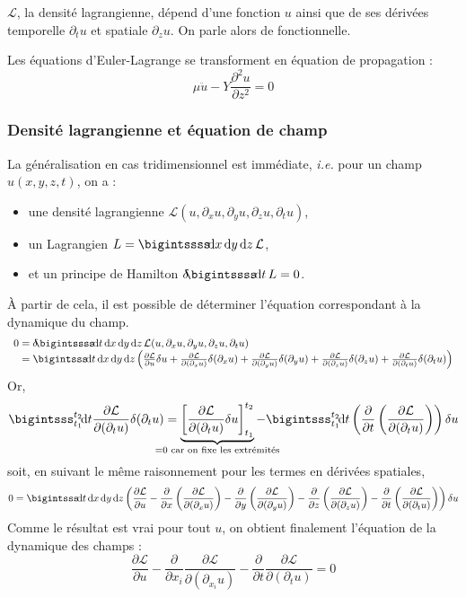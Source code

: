 $\mathcal{L}$, la densité lagrangienne, dépend d'une fonction $u$ ainsi que de ses dérivées temporelle $\partial_t u$ et spatiale $\partial_z u$. On parle alors de fonctionnelle.

Les équations d'Euler-Lagrange se transforment en équation de propagation :
$$
	\mu \ddot{u}-Y\frac{\partial^2u}{\partial z^2}=0
$$

\subsubsection{Densité lagrangienne et équation de champ}
La généralisation en cas tridimensionnel est immédiate, \emph{i.e.} pour un champ $u(x,y,z,t)$, on a :
\begin{itemize}
	\item une densité lagrangienne $\mathcal{L}(u,\partial_x u,\partial_y u,\partial_z u,\partial_t u)$,
	\item un Lagrangien $L=\bigintssss \!\dif x\,\dif y\,\dif z\, \mathcal{L}$,
	\item et un principe de Hamilton $\delta\!\!\bigintssss\!\dif t\, L = 0$.
\end{itemize}
À partir de cela, il est possible de déterminer l'équation correspondant à la dynamique du champ.
$$
	\begin{array}{r@{\;}l}
		0&=\delta\!\!\bigintssss\!\dif t\,\dif x\,\dif y\,\dif z\,\mathcal{L}(u,\partial_x u,\partial_y u,\partial_z u,\partial_t u)\\
			&=\bigintsss\!\dif t\,\dif x\,\dif y\,\dif z \left(\frac{\partial \mathcal{L}}{\partial u}\delta u
				+ \frac{\partial \mathcal{L}}{\partial(\partial_x u)}\delta(\partial_x u)
				+ \frac{\partial \mathcal{L}}{\partial(\partial_y u)}\delta(\partial_y u)
				+ \frac{\partial \mathcal{L}}{\partial(\partial_z u)}\delta(\partial_z u)
				+ \frac{\partial \mathcal{L}}{\partial(\partial_t u)}\delta(\partial_t u)\right)
	\end{array}
$$
Or,
$$
	\bigintsss_{t_1}^{t_2}\!\dif t\frac{\partial \mathcal{L}}{\partial(\partial_t u)}\delta(\partial_t u)
		=\underbrace{\left[\frac{\partial \mathcal{L}}{\partial(\partial_t u)}\delta u\right]^{t_2}_{t_1}}_{\mathclap{=0\text{ car on fixe les extrémités}}}
			-\bigintsss^{t_2}_{t_1}\!\dif t\left(\frac{\partial}{\partial t}\left(\frac{\partial \mathcal{L}}{\partial(\partial_t u)}\right)\right)\delta u
$$
soit, en suivant le même raisonnement pour les termes en dérivées spatiales,
$$
	0=\bigintsss\!\dif t\,\dif x\,\dif y\,\dif z\left(\frac{\partial \mathcal{L}}{\partial u}
		-\frac{\partial}{\partial x}\left(\frac{\partial \mathcal{L}}{\partial(\partial_x u)}\right)
		-\frac{\partial}{\partial y}\left(\frac{\partial \mathcal{L}}{\partial(\partial_y u)}\right)
		-\frac{\partial}{\partial z}\left(\frac{\partial \mathcal{L}}{\partial(\partial_z u)}\right)
		-\frac{\partial}{\partial t}\left(\frac{\partial \mathcal{L}}{\partial(\partial_t u)}\right)\right)\delta u
$$
Comme le résultat est vrai pour tout $u$, on obtient finalement l'équation de la dynamique des champs :
$$
	\boxed{\frac{\partial \mathcal{L}}{\partial u}-\frac{\partial}{\partial x_i}\frac{\partial \mathcal{L}}{\partial(\partial_{x_i}u)}-\frac{\partial}{\partial t}\frac{\partial \mathcal{L}}{\partial(\partial_{t}u)}=0}
$$

